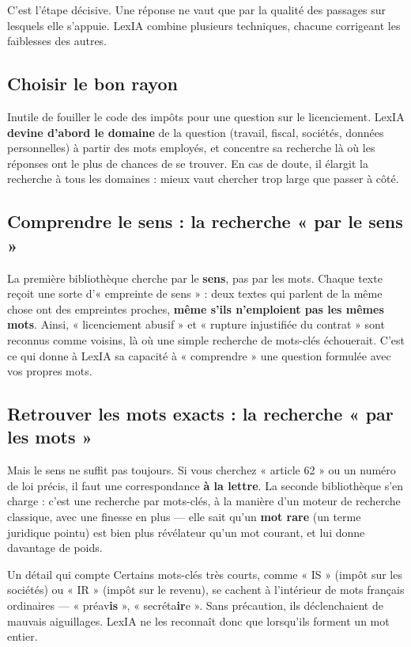 \documentclass[11pt,a4paper]{article}
\begin{document}
C'est l'étape décisive. Une réponse ne vaut que par la qualité des passages sur lesquels elle
s'appuie. LexIA combine plusieurs techniques, chacune corrigeant les faiblesses des autres.

\subsection{Choisir le bon rayon}
Inutile de fouiller le code des impôts pour une question sur le licenciement. LexIA \textbf{devine
d'abord le domaine} de la question (travail, fiscal, sociétés, données personnelles) à partir des
mots employés, et concentre sa recherche là où les réponses ont le plus de chances de se trouver. En
cas de doute, il élargit la recherche à tous les domaines : mieux vaut chercher trop large que passer
à côté.

\subsection{Comprendre le sens : la recherche « par le sens »}
La première bibliothèque cherche par le \textbf{sens}, pas par les mots. Chaque texte reçoit une
sorte d'« empreinte de sens » : deux textes qui parlent de la même chose ont des empreintes proches,
\textbf{même s'ils n'emploient pas les mêmes mots}. Ainsi, « licenciement abusif » et « rupture
injustifiée du contrat » sont reconnus comme voisins, là où une simple recherche de mots-clés
échouerait. C'est ce qui donne à LexIA sa capacité à « comprendre » une question formulée avec vos
propres mots.

\subsection{Retrouver les mots exacts : la recherche « par les mots »}
Mais le sens ne suffit pas toujours. Si vous cherchez « article 62 » ou un numéro de loi précis, il
faut une correspondance \textbf{à la lettre}. La seconde bibliothèque s'en charge : c'est une
recherche par mots-clés, à la manière d'un moteur de recherche classique, avec une finesse en plus
--- elle sait qu'un \textbf{mot rare} (un terme juridique pointu) est bien plus révélateur qu'un mot
courant, et lui donne davantage de poids.

\begin{encadre}{Un détail qui compte}
Certains mots-clés très courts, comme « IS » (impôt sur les sociétés) ou « IR » (impôt sur le
revenu), se cachent à l'intérieur de mots français ordinaires --- « préav\textbf{is} »,
« secréta\textbf{ir}e ». Sans précaution, ils déclenchaient de mauvais aiguillages. LexIA ne les
reconnaît donc que lorsqu'ils forment un mot entier.
\end{encadre}
\end{document}
